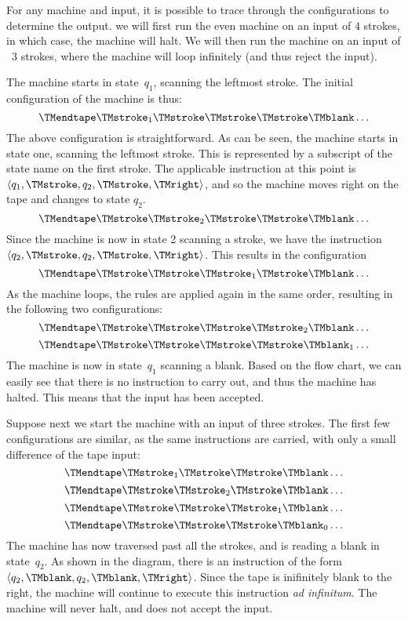 \documentclass[../../include/open-logic-section]{subfiles}
\begin{document}
\begin{ex}
For any machine and input, it is possible to trace through the configurations
to determine the output. we will first run the even machine on an input of $4$ 
strokes, in which case, the machine will halt. We will then run the machine on 
an input of ~$3$ strokes, where the machine will loop infinitely (and thus reject
the input). 

The machine starts in state~$q_1$, scanning the leftmost stroke.
The initial configuration of the machine is thus:
\[
\TMendtape \TMstroke_1 \TMstroke \TMstroke \TMstroke \TMblank \ldots
\]
The above configuration is straightforward. As can be seen, the machine starts
in state one, scanning the leftmost stroke. This is represented by a subscript of
the state name on the first stroke. The applicable instruction at this point is $\langle
q_1, \TMstroke, q_2, \TMstroke, \TMright \rangle$, and so the machine moves
right on the tape and changes to state $q_2$.
\[
\TMendtape \TMstroke \TMstroke_2 \TMstroke \TMstroke \TMblank \ldots
\]
Since the machine is now in state 2 scanning a stroke, we have the instruction
$\langle q_2, \TMstroke, q_2, \TMstroke, \TMright \rangle$. This results in the
configuration
\[
\TMendtape \TMstroke \TMstroke \TMstroke_1 \TMstroke \TMblank \ldots
\]
As the machine loops, the rules are applied again in the same order, resulting
in the following two configurations:
\[
\TMendtape \TMstroke \TMstroke \TMstroke \TMstroke_2 \TMblank \ldots
\]
\[
\TMendtape \TMstroke \TMstroke \TMstroke \TMstroke \TMblank_1 \ldots
\]
The machine is now in state~$q_1$ scanning a blank. Based on the flow
chart, we can easily see that there is no instruction to carry out, and thus the
machine has halted. This means that the input has been accepted.

Suppose next we start the machine with an input of three strokes. The
first few configurations are similar, as the same instructions are carried, with
only a small difference of the tape input:
\[
\TMendtape \TMstroke_1 \TMstroke \TMstroke \TMblank \ldots
\]
\[
\TMendtape \TMstroke \TMstroke_2 \TMstroke \TMblank \ldots
\]
\[
\TMendtape \TMstroke \TMstroke \TMstroke_1 \TMblank \ldots
\]
\[
\TMendtape \TMstroke \TMstroke \TMstroke \TMblank_0 \ldots
\]
The machine has now traversed past all the strokes, and is reading
a blank in state~$q_2$. As shown in the diagram, there is an instruction
of the form $\langle q_2, \TMblank, q_2, \TMblank, \TMright \rangle$.
Since the tape is inifinitely blank to the right, the machine will continue to
execute this instruction \emph{ad infinitum}. The machine will never halt,
and does not accept the input.
\end{ex}
\end{document}
